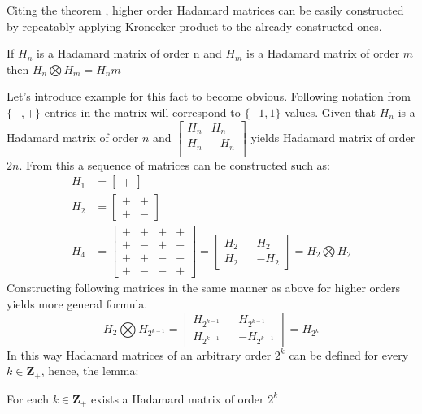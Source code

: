 Citing the theorem \cite{05_hedayat_wallis_hadamard_matrices}, higher order Hadamard matrices can be easily constructed by repeatably applying Kronecker product to the already constructed ones.
\begin{theorem}
If $H_n$ is a Hadamard matrix of order n and $H_m$ is a Hadamard matrix of order $m$ then $H_n \bigotimes H_m = H_nm$  
\end{theorem}
Let's introduce example for this fact to become obvious. Following notation from \cite{05_hedayat_wallis_hadamard_matrices} $\{-, +\}$ entries in the matrix will correspond to $\{-1, 1\}$ values.
Given that $H_n$ is a Hadamard matrix of order $n$ and $\begin{bmatrix}
    H_n & H_n \\
    H_n & -H_n \\
\end{bmatrix}$ yields Hadamard matrix of order $2n$.
From this a sequence of matrices can be constructed such as:
\begin{align*}
H_1 &= \begin{bmatrix}+\end{bmatrix} \\
H_2 &= \begin{bmatrix}+ & + \\ + & -\end{bmatrix} \\
H_4 &= \begin{bmatrix}
        + & + & + & + \\ 
        + & - & + & - \\
        + & + & - & - \\
        + & - & - & + 
        \end{bmatrix} =  
        \begin{bmatrix}
            H_2 && H_2 \\
            H_2 && -H_2
        \end{bmatrix} = 
        H_2 \bigotimes H_2
\end{align*}
Constructing following matrices in the same manner as above for higher orders yields more general formula.
\begin{equation}
\label{05:HM:recursive_definition}
    H_2 \bigotimes H_{2^{k-1}} = 
    \begin{bmatrix}
        H_{2^{k-1}} && H_{2^{k-1}} \\
        H_{2^{k-1}} && -H_{2^{k-1}}
    \end{bmatrix} = 
    H_{2^k}
\end{equation}
In this way Hadamard matrices of an arbitrary order $2^{k}$ can be defined for every $k \in \mathbf{Z}_+$, hence, the lemma:
\begin{lemma}
    For each $k \in \mathbf{Z}_+$ exists a Hadamard matrix of order $2^k$ 
\end{lemma}

